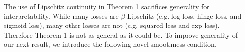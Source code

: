 \documentclass[thesis.tex]{subfiles}
\newcommand{\qhi}{\alpha_\text{hi}}
\newcommand{\qlo}{\alpha_\text{lo}}
\begin{document}
The use of Lipschitz continuity in Theorem 1 sacrifices generality for interpretability.
While many losses are $\beta$-Lipschitz (e.g. log loss, hinge loss, and sigmoid loss),
many other losses are not (e.g. squared loss and exp loss).
Therefore Theorem 1 is not as general as it could be.
To improve generality of our next result, we introduce the following novel smoothness condition.

%
%
%
%
\end{document}
